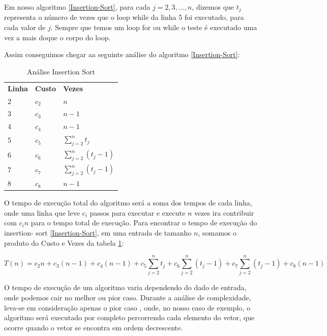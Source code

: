 \documentclass[
	12pt,				%
	openright,			%
	oneside,			%
	a4paper,			%
	english,			%
	brazil				%
	]{abntex2}
\begin{document}
Em nosso algoritmo \ref{Insertion-Sort}, para cada $j = 2, 3, ..., n$, dizemos que $t_j$ representa o número de vezes que
o loop while da linha 5 foi executado, para cada valor de $j$. Sempre que temos um loop for ou while o teste é
executado uma vez a mais doque o corpo do loop.

Assim conseguimos chegar aa seguinte análise do algoritmo \ref{Insertion-Sort}:

\begin{table}[H]
	\centering
	\caption{\label{Análise-Insertion-Sort} Análise Insertion Sort}
	\begin{tabular}{lll}
		\textbf{Linha} & \textbf{Custo} & \textbf{Vezes} \\
		2 & $c_2$ & $n$ \\
		3 & $c_3$ & $n-1$ \\
		4 & $c_4$ & $n-1$ \\
		5 & $c_5$ & $\sum_{j=2}^{n} t_j$ \\
		6 & $c_6$ & $\sum_{j=2}^{n} (t_j - 1)$ \\
		7 & $c_7$ & $\sum_{j=2}^{n} (t_j - 1)$ \\
		8 & $c_8$ & $n-1$ \\
	\end{tabular}
\end{table}

O tempo de execução total do algoritmo será a soma dos tempos de cada linha, onde uma linha que leve $c_i$ passos para executar
e execute $n$ vezes ira contribuir com $c_in$ para o tempo total de execução. Para encontrar o tempo de execução do insertion-
sort \ref{Insertion-Sort}, em uma entrada de tamanho $n$, somamos o produto do Custo e Vezes da tabela \ref{Análise-Insertion-Sort}:

\begin{equation}
	\label{tempo-execução-insertion-sort}
	T(n) = c_2n + c_3(n - 1) + c_4(n - 1) + c_5\sum_{j=2}^{n} t_j + c_6\sum_{j=2}^{n} (t_j - 1) + c_7\sum_{j=2}^{n} (t_j - 1) + c_8(n-1)
\end{equation}

O tempo de execução de um algoritmo varia dependendo do dado de entrada, onde podemos cair no melhor ou pior caso. Durante a
análise de complexidade, leva-se em consideração apenas o pior caso \cite{introductionAlgorthms}, onde, no nosso caso de exemplo, 
o algoritmo será executado por completo percorrendo cada elemento do vetor, que ocorre quando o vetor se encontra em ordem decrescente.
\end{document}
